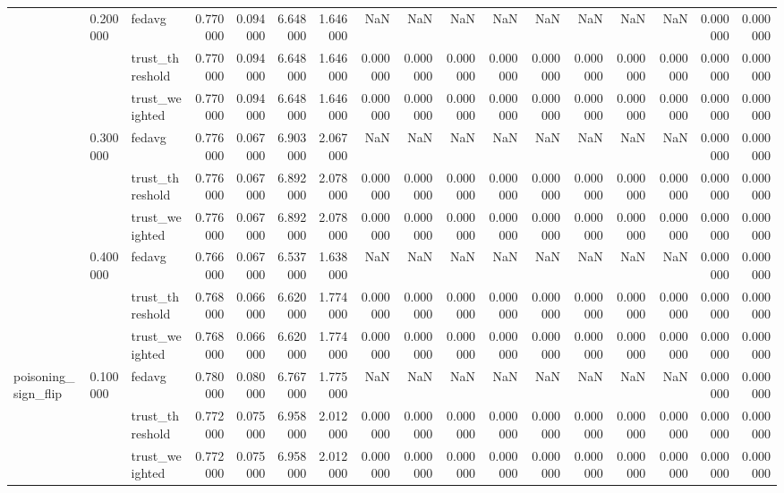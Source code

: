 \begin{tabular}{lllrrrrrrrrrrrrrr}
\cline{2-17}
 & \multirow[t]{3}{*}{0.200000} & fedavg & 0.770000 & 0.094000 & 6.648000 & 1.646000 & NaN & NaN & NaN & NaN & NaN & NaN & NaN & NaN & 0.000000 & 0.000000 \\
 &  & trust_threshold & 0.770000 & 0.094000 & 6.648000 & 1.646000 & 0.000000 & 0.000000 & 0.000000 & 0.000000 & 0.000000 & 0.000000 & 0.000000 & 0.000000 & 0.000000 & 0.000000 \\
 &  & trust_weighted & 0.770000 & 0.094000 & 6.648000 & 1.646000 & 0.000000 & 0.000000 & 0.000000 & 0.000000 & 0.000000 & 0.000000 & 0.000000 & 0.000000 & 0.000000 & 0.000000 \\
\cline{2-17}
 & \multirow[t]{3}{*}{0.300000} & fedavg & 0.776000 & 0.067000 & 6.903000 & 2.067000 & NaN & NaN & NaN & NaN & NaN & NaN & NaN & NaN & 0.000000 & 0.000000 \\
 &  & trust_threshold & 0.776000 & 0.067000 & 6.892000 & 2.078000 & 0.000000 & 0.000000 & 0.000000 & 0.000000 & 0.000000 & 0.000000 & 0.000000 & 0.000000 & 0.000000 & 0.000000 \\
 &  & trust_weighted & 0.776000 & 0.067000 & 6.892000 & 2.078000 & 0.000000 & 0.000000 & 0.000000 & 0.000000 & 0.000000 & 0.000000 & 0.000000 & 0.000000 & 0.000000 & 0.000000 \\
\cline{2-17}
 & \multirow[t]{3}{*}{0.400000} & fedavg & 0.766000 & 0.067000 & 6.537000 & 1.638000 & NaN & NaN & NaN & NaN & NaN & NaN & NaN & NaN & 0.000000 & 0.000000 \\
 &  & trust_threshold & 0.768000 & 0.066000 & 6.620000 & 1.774000 & 0.000000 & 0.000000 & 0.000000 & 0.000000 & 0.000000 & 0.000000 & 0.000000 & 0.000000 & 0.000000 & 0.000000 \\
 &  & trust_weighted & 0.768000 & 0.066000 & 6.620000 & 1.774000 & 0.000000 & 0.000000 & 0.000000 & 0.000000 & 0.000000 & 0.000000 & 0.000000 & 0.000000 & 0.000000 & 0.000000 \\
\cline{1-17} \cline{2-17}
\multirow[t]{12}{*}{poisoning_sign_flip} & \multirow[t]{3}{*}{0.100000} & fedavg & 0.780000 & 0.080000 & 6.767000 & 1.775000 & NaN & NaN & NaN & NaN & NaN & NaN & NaN & NaN & 0.000000 & 0.000000 \\
 &  & trust_threshold & 0.772000 & 0.075000 & 6.958000 & 2.012000 & 0.000000 & 0.000000 & 0.000000 & 0.000000 & 0.000000 & 0.000000 & 0.000000 & 0.000000 & 0.000000 & 0.000000 \\
 &  & trust_weighted & 0.772000 & 0.075000 & 6.958000 & 2.012000 & 0.000000 & 0.000000 & 0.000000 & 0.000000 & 0.000000 & 0.000000 & 0.000000 & 0.000000 & 0.000000 & 0.000000 \\

\end{tabular}
